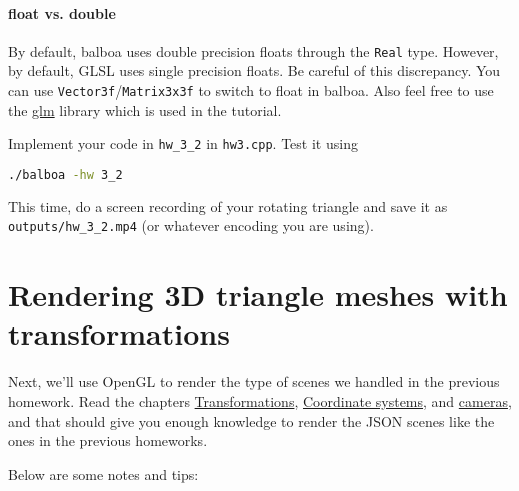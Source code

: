 \paragraph{float vs. double} By default, balboa uses double precision floats through the \lstinline{Real} type. However, by default, GLSL uses single precision floats. Be careful of this discrepancy. You can use \lstinline{Vector3f}/\lstinline{Matrix3x3f} to switch to float in balboa. Also feel free to use the \href{https://github.com/g-truc/glm}{glm} library which is used in the tutorial.

Implement your code in \lstinline{hw_3_2} in \lstinline{hw3.cpp}. Test it using
\begin{lstlisting}[language=bash]
./balboa -hw 3_2
\end{lstlisting}

This time, do a screen recording of your rotating triangle and save it as \lstinline{outputs/hw_3_2.mp4} (or whatever encoding you are using).

\section{Rendering 3D triangle meshes with transformations}

Next, we'll use OpenGL to render the type of scenes we handled in the previous homework. Read the chapters \href{https://learnopengl.com/Getting-started/Transformations}{Transformations}, \href{https://learnopengl.com/Getting-started/Coordinate-Systems}{Coordinate systems}, and \href{https://learnopengl.com/Getting-started/Camera}{cameras}, and that should give you enough knowledge to render the JSON scenes like the ones in the previous homeworks. 

Below are some notes and tips:

